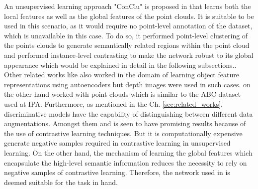 An unsupervised learning approach "ConClu" is proposed in \cite{mei2022unsupervised} that learns both the local features as well as the global features of the point clouds. It is suitable to be used in this scenario, as it would require no point-level annotation of the dataset, which is unavailable in this case. To do so, it performed point-level clustering of the points clouds to generate semantically related regions within the point cloud and performed instance-level contrasting to make the network robust to its global appearance which would be explained in detail in the following subsections.\cite{mei2022unsupervised}. Other related works like \cite{zhu2016deep} also worked in the domain of learning object feature representations using autoencoders but depth images were used in such cases. \cite{mei2022unsupervised} on the other hand worked with point clouds which is similar to the ABC dataset used at \ac{IPA}. Furthermore, as mentioned in the Ch. \ref{sec:related_works}, discriminative models have the capability of distinguishing between different data augmentations. Amongst them \cite{rao2020global} and \cite{sanghi2020info3d} is seen to have promising results because of the use of contrastive learning techniques. But it is computationally expensive generate negative samples required in contrastive learning in unsupervised learning. On the other hand, the mechanism of learning the global features which encapsulate the high-level semantic information reduces the necessity to rely on negative samples of contrastive learning. Therefore, the network used in \cite{mei2022unsupervised} is deemed suitable for the task in hand.\cite{mei2022unsupervised}


